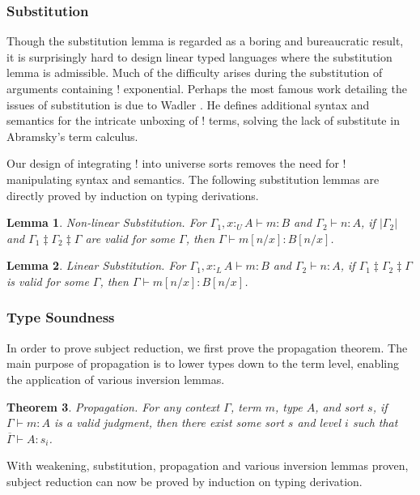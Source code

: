 \documentclass[sigplan,screen]{acmart}
\newtheorem{theorem}{Theorem}[section]
\newtheorem{lemma}[theorem]{Lemma}
\theoremstyle{definition}
\newcommand{\pure}[1]{|#1|}
\newcommand{\utype}{:_{\scriptscriptstyle U}}
\newcommand{\ltype}{:_{\scriptscriptstyle L}}
\newcommand{\mrg}[3]{#1\ddagger#2\ddagger#3}
\begin{document}
  \subsubsection{Substitution} \label{subst}
  Though the substitution lemma is regarded as a boring and bureaucratic result, it is surprisingly hard to design linear typed languages where the substitution lemma is admissible. Much of the difficulty arises during the substitution of arguments containing ! exponential. Perhaps the most famous work detailing the issues of substitution is due to Wadler \cite{substitute}. He defines additional syntax and semantics for the intricate unboxing of ! terms, solving the lack of substitute in Abramsky's term calculus.

  Our design of integrating ! into universe sorts removes the need for ! manipulating syntax and semantics. The following substitution lemmas are directly proved by induction on typing derivations.

  \begin{lemma} 
    Non-linear Substitution. For $\Gamma_1, x \utype A \vdash m : B$ and $\Gamma_2 \vdash n : A$, if $\pure{\Gamma_2}$ and $\mrg{\Gamma_1}{\Gamma_2}{\Gamma}$ are valid for some $\Gamma$, then $\Gamma \vdash m[n/x] : B[n/x]$.
  \end{lemma}

  \begin{lemma} 
    Linear Substitution. For $\Gamma_1, x \ltype A \vdash m : B$ and $\Gamma_2 \vdash n : A$, if $\mrg{\Gamma_1}{\Gamma_2}{\Gamma}$ is valid for some $\Gamma$, then $\Gamma \vdash m[n/x] : B[n/x]$.
  \end{lemma}

  \subsubsection{Type Soundness}
  In order to prove subject reduction, we first prove the propagation theorem. The main purpose of propagation is to lower types down to the term level, enabling the application of various inversion lemmas.

  \begin{theorem} 
    Propagation. For any context $\Gamma$, term $m$, type $A$, and sort $s$, if $\Gamma \vdash m : A$ is a valid judgment, then there exist some sort $s$ and level $i$ such that $\overline{\Gamma} \vdash A : s_i$.
    \label{propagation}
  \end{theorem}

  With weakening, substitution, propagation and various inversion lemmas proven, subject reduction can now be proved by induction on typing derivation.
\end{document}
